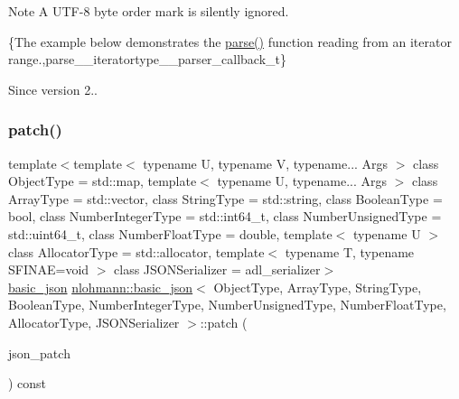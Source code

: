 \begin{DoxyNote}{Note}
A U\+T\+F-\/8 byte order mark is silently ignored.
\end{DoxyNote}
\{The example below demonstrates the {\ttfamily \mbox{\hyperlink{classnlohmann_1_1basic__json_a265a473e939184aa42655c9ccdf34e58}{parse()}}} function reading from an iterator range.,parse\+\_\+\+\_\+iteratortype\+\_\+\+\_\+parser\+\_\+callback\+\_\+t\}

\begin{DoxySince}{Since}
version 2.. 
\end{DoxySince}
\mbox{\label{classnlohmann_1_1basic__json_a81e0c41a4a9dff4df2f6973f7f8b2a83}} 
\subsubsection{\texorpdfstring{patch()}{patch()}}
{\footnotesize\ttfamily template$<$template$<$ typename U, typename V, typename... Args $>$ class Object\+Type = std\+::map, template$<$ typename U, typename... Args $>$ class Array\+Type = std\+::vector, class String\+Type  = std\+::string, class Boolean\+Type  = bool, class Number\+Integer\+Type  = std\+::int64\+\_\+t, class Number\+Unsigned\+Type  = std\+::uint64\+\_\+t, class Number\+Float\+Type  = double, template$<$ typename U $>$ class Allocator\+Type = std\+::allocator, template$<$ typename T, typename S\+F\+I\+N\+A\+E=void $>$ class J\+S\+O\+N\+Serializer = adl\+\_\+serializer$>$ \\
\mbox{\hyperlink{classnlohmann_1_1basic__json}{basic\+\_\+json}} \mbox{\hyperlink{classnlohmann_1_1basic__json}{nlohmann\+::basic\+\_\+json}}$<$ Object\+Type, Array\+Type, String\+Type, Boolean\+Type, Number\+Integer\+Type, Number\+Unsigned\+Type, Number\+Float\+Type, Allocator\+Type, J\+S\+O\+N\+Serializer $>$\+::patch (\begin{DoxyParamCaption}\item[{const \mbox{\hyperlink{classnlohmann_1_1basic__json}{basic\+\_\+json}}$<$ Object\+Type, Array\+Type, String\+Type, Boolean\+Type, Number\+Integer\+Type, Number\+Unsigned\+Type, Number\+Float\+Type, Allocator\+Type, J\+S\+O\+N\+Serializer $>$ \&}]{json\+\_\+patch }\end{DoxyParamCaption}) const\hspace{0.3cm}{\ttfamily [inline]}}




